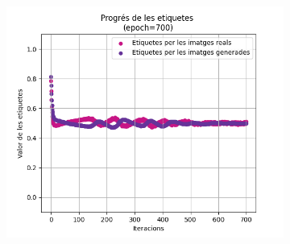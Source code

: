 \begin{figure}[H]
\begin{subfigure}[b]{.32\linewidth}
		\caption{}
	\end{subfigure}
	\begin{subfigure}[b]{.32\linewidth}
		\includegraphics[width=\linewidth]{figures/data/L_6.png}
		\caption{}
	\end{subfigure}
	

\end{figure}
